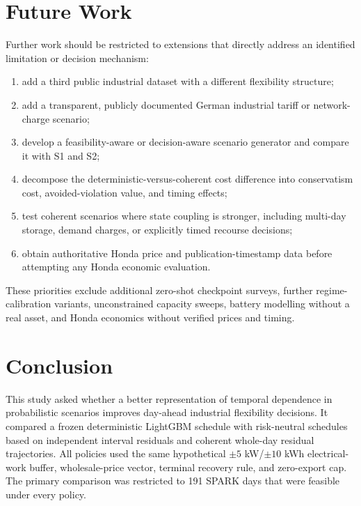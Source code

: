 \documentclass[10pt,twocolumn]{article}
\begin{document}
\section{Future Work}
\label{sec:future}

Further work should be restricted to extensions that directly address an
identified limitation or decision mechanism:

\begin{enumerate}
  \item add a third public industrial dataset with a different flexibility
  structure;
  \item add a transparent, publicly documented German industrial tariff or
  network-charge scenario;
  \item develop a feasibility-aware or decision-aware scenario generator and
  compare it with S1 and S2;
  \item decompose the deterministic-versus-coherent cost difference into
  conservatism cost, avoided-violation value, and timing effects;
  \item test coherent scenarios where state coupling is stronger, including
  multi-day storage, demand charges, or explicitly timed recourse decisions;
  \item obtain authoritative Honda price and publication-timestamp data before
  attempting any Honda economic evaluation.
\end{enumerate}

These priorities exclude additional zero-shot checkpoint surveys, further
regime-calibration variants, unconstrained capacity sweeps, battery modelling
without a real asset, and Honda economics without verified prices and timing.

\section{Conclusion}
\label{sec:conclusion}

This study asked whether a better representation of temporal dependence in
probabilistic scenarios improves day-ahead industrial flexibility decisions.
It compared a frozen deterministic LightGBM schedule with risk-neutral schedules
based on independent interval residuals and coherent whole-day residual
trajectories. All policies used the same hypothetical $\pm5$ kW/$\pm10$ kWh
electrical-work buffer, wholesale-price vector, terminal recovery rule, and
zero-export cap. The primary comparison was restricted to 191 SPARK days that
were feasible under every policy.
\end{document}

